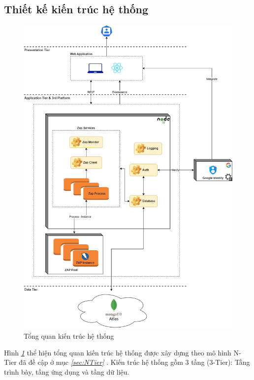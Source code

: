 \subsection{Thiết kế kiến trúc hệ thống} \label{subsec:TKKienTrucHeThong}
\begin{figure}[H]
      \centering
      \includegraphics[width=\textwidth]{applied-thesis-chapters/chapter-3/Tổng quan kiến trúc hệ thống.png}
      \caption{Tổng quan kiến trúc hệ thống}
      \label{fig:KienTrucHeThong}
\end{figure}
\tab Hình \textit{\ref{fig:KienTrucHeThong} } thể hiện tổng quan kiến trúc hệ thống được xây dựng theo mô hình N-Tier đã đề cập ở mục \textit{\ref{sec:NTier} }.
Kiến trúc hệ thống gồm 3 tầng (3-Tier): Tầng trình bày, tầng ứng dụng và tầng dữ liệu.

